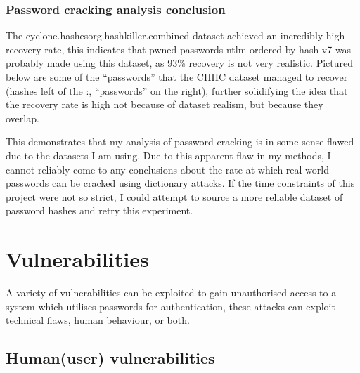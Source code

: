 \documentclass[11pt]{article}
\begin{document}
\subsubsection{Password cracking analysis conclusion}
The cyclone.hashesorg.hashkiller.combined dataset achieved an incredibly high recovery rate, this indicates that pwned-passwords-ntlm-ordered-by-hash-v7 was probably made using this dataset, as 93\% recovery is not very realistic.
Pictured below are some of the ``passwords'' that the CHHC dataset managed to recover (hashes left of the :, ``passwords'' on the right), further solidifying the idea that the recovery rate is high not because of dataset realism, but because they overlap.
\begin{center}
\end{center}
This demonstrates that my analysis of password cracking is in some sense flawed due to the datasets I am using.
Due to this apparent flaw in my methods, I cannot reliably come to any conclusions about the rate at which real-world passwords can be cracked using dictionary attacks.
If the time constraints of this project were not so strict, I could attempt to source a more reliable dataset of password hashes and retry this experiment.


\section{Vulnerabilities} \label{VULN}
A variety of vulnerabilities can be exploited to gain unauthorised access to a system which utilises passwords for authentication, these attacks can exploit technical flaws, human behaviour, or both.
\subsection{Human(user) vulnerabilities}
\end{document}
